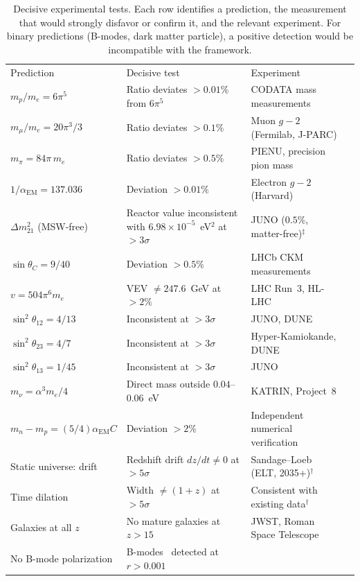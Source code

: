 \documentclass[aps,prd,twocolumn,superscriptaddress,nofootinbib,longbibliography]{revtex4-2}
\newcommand{\aEM}{\alpha_{\mathrm{EM}}}
\begin{document}
\begin{table}[t]
\caption{\label{tab:falsify}%
Decisive experimental tests.  Each row identifies a prediction, the
measurement that would strongly disfavor or confirm it, and the
relevant experiment.  For binary predictions (B-modes, dark matter
particle), a positive detection would be incompatible with the
framework.}
\begin{ruledtabular}
\begin{tabular}{llll}
Prediction & Decisive test & Experiment \\
\colrule
$m_p/m_e = 6\pi^5$ & Ratio deviates $> 0.01\%$ from $6\pi^5$
  & CODATA mass measurements \\
$m_\mu/m_e = 20\pi^3/3$ & Ratio deviates $> 0.1\%$
  & Muon $g{-}2$ (Fermilab, J-PARC) \\
$m_\pi = 84\pi\,m_e$ & Ratio deviates $> 0.5\%$
  & PIENU, precision pion mass \\
$1/\aEM = 137.036$ & Deviation $> 0.01\%$
  & Electron $g{-}2$ (Harvard) \\
$\Delta m^2_{21}$ (MSW-free) & Reactor value inconsistent with
  $6.98 \times 10^{-5}$~eV$^2$ at $> 3\sigma$
  & JUNO ($0.5\%$, matter-free)$^\ddag$ \\
$\sin\theta_C = 9/40$ & Deviation $> 0.5\%$
  & LHCb CKM measurements \\
$v = 504\pi^6 m_e$ & VEV $\neq 247.6$~GeV at $> 2\%$
  & LHC Run~3, HL-LHC \\
$\sin^2\theta_{12} = 4/13$ & Inconsistent at $> 3\sigma$
  & JUNO, DUNE \\
$\sin^2\theta_{23} = 4/7$ & Inconsistent at $> 3\sigma$
  & Hyper-Kamiokande, DUNE \\
$\sin^2\theta_{13} = 1/45$ & Inconsistent at $> 3\sigma$
  & JUNO \\
$m_\nu = \alpha^3 m_e/4$ & Direct mass outside
  $0.04$--$0.06$~eV & KATRIN, Project~8 \\
$m_n - m_p = (5/4)\aEM C$ & Deviation $> 2\%$
  & Independent numerical verification \\
Static universe: drift & Redshift drift $dz/dt \neq 0$ at $> 5\sigma$
  & Sandage--Loeb (ELT, 2035+)$^\dag$ \\
Time dilation & Width $\neq (1+z)$ at $> 5\sigma$
  & Consistent with existing data$^\dag$ \\
Galaxies at all $z$ & No mature galaxies at $z > 15$
  & JWST, Roman Space Telescope \\
No B-mode polarization & B-modes~\cite{BICEP2021} detected at $r > 0.001$

\end{tabular}
\end{ruledtabular}
\end{table}
\end{document}
